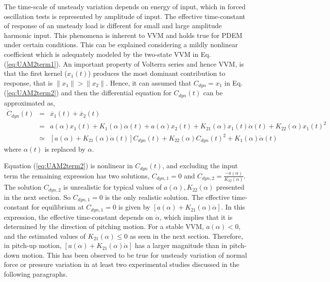 \documentclass{AIAA}
\begin{document}
The time-scale of unsteady variation depends on energy of input, which in forced oscillation tests is represented by amplitude of input. The effective time-constant of response of an unsteady load is different for small and large amplitude harmonic input. This phenomena is inherent to VVM and holds true for PDEM under certain conditions. This can be explained considering a mildly nonlinear coefficient which is adequately modeled by the two-state VVM in Eq.(\ref{eq:UAM2term1}). An important property of Volterra series and hence VVM, is that the first kernel ($x_1(t)$) produces the most dominant contribution to response, that is $\| x_1\| > \| x_2\|$. Hence, it can assumed that $C_{dyn} = x_1$ in Eq.(\ref{eq:UAM2term2}) and then the differential equation for $C_{dyn}(t)$ can be approximated as,
\begin{eqnarray}
\label{eq:UAM2term1}\dot{C}_{dyn}(t)&=& \dot{x_1}(t) + \dot{x_2}(t)  \\
            &=&a(\alpha)x_1(t)+ K_1(\alpha)\dot{\alpha}(t) + a(\alpha)x_2(t)+ K_{21}(\alpha)x_1(t)\dot{\alpha}(t) + K_{22}(\alpha)x_1(t)^2 \nonumber \\
\label{eq:UAM2term2}            
&\simeq& [a(\alpha) + K_{21}(\alpha) \dot{\alpha}(t) ]C_{dyn}(t) + K_{22}(\alpha) C_{dyn}(t)^2 + K_1(\alpha)\dot{\alpha}(t)
\end{eqnarray}
where $\alpha(t)$ is replaced by $\alpha$. 


Equation (\ref{eq:UAM2term2}) is nonlinear in $C_{dyn}(t)$, and excluding the input term the remaining expression has two solutions, $C_{dyn,1}=0$ and $C_{dyn,2}=\frac{-a(\alpha)}{K_{22}(\alpha)}$.  The solution $C_{dyn,2}$ is unrealistic for typical values of $a(\alpha), K_{22}(\alpha)$ presented in the next section. So $C_{dyn,1}=0$ is the only realistic solution. The effective time-constant for equilibrium at $C_{dyn,1}=0$ is given by $[a(\alpha)+K_{21}(\alpha)\dot{\alpha}]$. In this expression, the effective time-constant depends on $\dot{\alpha}$, which implies that it is determined by the direction of pitching motion. For a stable VVM, $a(\alpha)<0$, and the estimated values of $K_{21}(\alpha) \leq 0$ as seen in the next section. Therefore, in pitch-up motion, $[a(\alpha)+K_{21}(\alpha)\dot{\alpha}]$ has a larger magnitude than in pitch-down motion. This has been observed to be true for unsteady variation of normal force or pressure variation in at least two experimental studies discussed in the following paragraphs.
\end{document}
